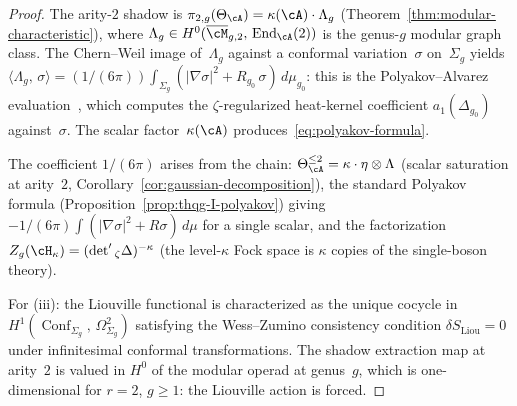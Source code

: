 \begin{proof}
The arity-$2$ shadow is
$\pi_{2,g}(\Theta_\cA) = \kappa(\cA) \cdot \Lambda_g$
(Theorem~\ref{thm:modular-characteristic}),
where $\Lambda_g \in H^0(\overline{\cM}_{g,2},\,
\operatorname{End}_\cA(2))$ is the genus-$g$ modular graph
class.  The Chern--Weil image of~$\Lambda_g$ against a conformal
variation~$\sigma$ on~$\Sigma_g$ yields
$\langle \Lambda_g,\, \sigma \rangle
= (1/(6\pi)) \int_{\Sigma_g}
(|\nabla\sigma|^2 + R_{g_0}\,\sigma)\,d\mu_{g_0}$:
this is the Polyakov--Alvarez evaluation~\cite{Alvarez1983},
which computes the $\zeta$-regularized heat-kernel coefficient
$a_1(\Delta_{g_0})$ against~$\sigma$.
The scalar factor~$\kappa(\cA)$
produces~\eqref{eq:polyakov-formula}.

The coefficient $1/(6\pi)$ arises from the chain:
$\Theta_\cA^{\leq 2} = \kappa \cdot \eta \otimes \Lambda$
(scalar saturation at arity~$2$,
Corollary~\ref{cor:gaussian-decomposition}),
the standard Polyakov formula
(Proposition~\ref{prop:thqg-I-polyakov})
giving $-1/(6\pi)\int(|\nabla\sigma|^2 + R\sigma)\,d\mu$
for a single scalar, and the factorization
$Z_g(\cH_\kappa) = (\det'{}_\zeta\Delta)^{-\kappa}$
(the level-$\kappa$ Fock space is $\kappa$ copies of
the single-boson theory).

For (iii): the Liouville functional is characterized as the
unique cocycle in
$H^1(\operatorname{Conf}_{\Sigma_g},\,\Omega^2_{\Sigma_g})$
satisfying the Wess--Zumino consistency condition
$\delta S_{\mathrm{Liou}} = 0$ under infinitesimal conformal
transformations.  The shadow extraction map at arity~$2$ is
valued in $H^0$ of the modular operad at genus~$g$, which is
one-dimensional for $r = 2$, $g \geq 1$: the Liouville action
is forced.
\end{proof}

